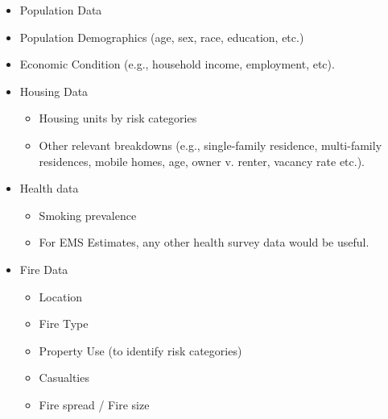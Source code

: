 \documentclass[12pt,oneside]{book}
\begin{document}
\begin{itemize}
  \item Population Data
  \item Population Demographics (age, sex, race, education, etc.)
  \item Economic Condition (e.g., household income, employment, etc).
  \item Housing Data
    \begin{itemize}
      \item Housing units by risk categories
      \item Other relevant breakdowns (e.g., single-family residence, multi-family residences, mobile homes, age, owner v. renter, vacancy rate etc.).
    \end{itemize}
  \item Health data
    \begin{itemize}
      \item Smoking prevalence
      \item For EMS Estimates, any other health survey data would be useful.
    \end{itemize}
  \item Fire Data
    \begin{itemize}
      \item Location
      \item Fire Type
      \item Property Use (to identify risk categories)
      \item Casualties
      \item Fire spread / Fire size
    \end{itemize}
\end{itemize}
\end{document}

